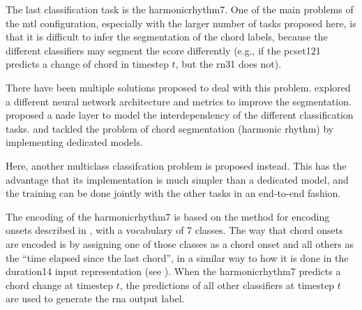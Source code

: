 
The last classification task is the \gls{harmonicrhythm7}.
One of the main problems of the \gls{mtl} configuration,
especially with the larger number of tasks proposed here, is
that it is difficult to infer the segmentation of the chord
labels, because the different classifiers may segment the
score differently (e.g., if the \gls{pcset121} predicts a
change of chord in timestep $t$, but the \gls{rn31} does
not).

There have been multiple solutions proposed to deal with
this problem. \textcite{chen2021attend} explored a different
neural network architecture and metrics to improve the
segmentation. \textcite{micchi2021deep} proposed a
\gls{nade} layer to model the interdependency of the
different classification tasks. \textcite{mcleod2021modular}
and \textcite{wu2021melody} tackled the problem of chord
segmentation (harmonic rhythm) by implementing dedicated
models. 

Here, another multiclass classifcation problem is proposed
instead. This has the advantage that its implementation is
much simpler than a dedicated model, and the training can be
done jointly with the other tasks in an end-to-end fashion.

The encoding of the \gls{harmonicrhythm7} is based on the
method for encoding onsets described in
, with a
vocabulary of 7 classes. The way that chord onsets are
encoded is by assigning one of those classes as a chord
onset and all others as the ``time elapsed since the last
chord'', in a similar way to how it is done in the
\gls{duration14} input representation (see
). When the
\gls{harmonicrhythm7} predicts a chord change at timestep
$t$, the predictions of all other classifiers at timestep
$t$ are used to generate the \gls{rna} output label.
